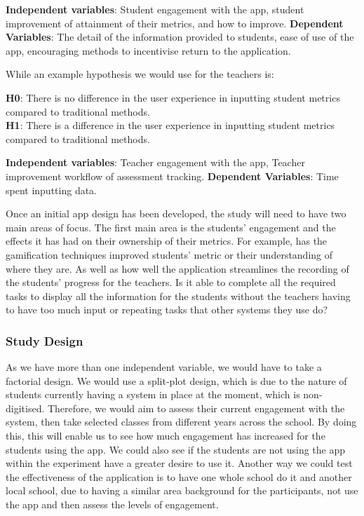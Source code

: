 \documentclass[sigchi]{acmart}
\begin{document}
\textbf{Independent variables}: Student engagement with the app, student improvement of attainment of their metrics, and how to improve.
\textbf{Dependent Variables}: The detail of the information provided to students, ease of use of the app, encouraging methods to incentivise return to the application.

While an  example hypothesis we would use for the teachers is:

\textbf{H0}: There is no difference in the user experience in inputting student metrics compared to traditional methods.\\
\textbf{H1}: There is a difference in the user experience in inputting student metrics compared to traditional methods.

\textbf{Independent variables}: Teacher engagement with the app, Teacher improvement workflow of assessment tracking.
\textbf{Dependent Variables}: Time spent inputting data.

Once an initial app design has been developed, the study will need to have two main areas of focus. The first main area is the students' engagement and the effects it has had on their ownership of their metrics. For example, has the gamification techniques improved students' metric or their understanding of where they are. As well as how well the application streamlines the recording of the students' progress for the teachers. Is it able to complete all the required tasks to display all the information for the students without the teachers having to have too much input or repeating tasks that other systems they use do?

\subsubsection{Study Design}
As we have more than one independent variable, we would have to take a factorial design. We would use a split-plot design, which is due to the nature of students currently having a system in place at the moment, which is non-digitised. Therefore, we would aim to assess their current engagement with the system, then take selected classes from different years across the school. By doing this, this will enable us to see how much engagement has increased for the students using the app. We could also see if the students are not using the app within the experiment have a greater desire to use it. Another way we could test the effectiveness of the application is to have one whole school do it and another local school, due to having a similar area background for the participants, not use the app and then assess the levels of engagement.
\end{document}
